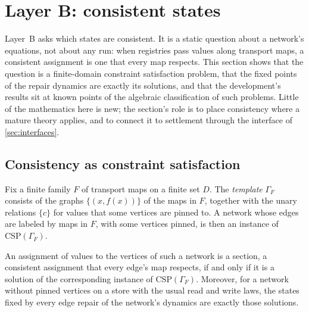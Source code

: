 
\section{Layer B: consistent states}\label{sec:layer-b}

Layer~B asks which states are consistent. It is a static question about a network's equations, not
about any run: when registries pass values along transport maps, a consistent assignment is one that
every map respects. This section shows that the question is a finite-domain constraint satisfaction
problem, that the fixed points of the repair dynamics are exactly its solutions, and that the
development's results sit at known points of the algebraic classification of such problems. Little of
the mathematics here is new; the section's role is to place consistency where a mature theory applies,
and to connect it to settlement through the interface of \cref{sec:interfaces}.

\subsection{Consistency as constraint satisfaction}

Fix a finite family $F$ of transport maps on a finite set $D$. The \emph{template} $\Gamma_F$ consists
of the graphs $\{(x, f(x))\}$ of the maps in $F$, together with the unary relations $\{c\}$ for values
that some vertices are pinned to. A network whose edges are labeled by maps in $F$, with some vertices
pinned, is then an instance of $\mathrm{CSP}(\Gamma_F)$.

\begin{theorem}\label{thm:csp}
An assignment of values to the vertices of such a network is a section, a consistent assignment that
every edge's map respects, if and only if it is a solution of the corresponding instance of
$\mathrm{CSP}(\Gamma_F)$. Moreover, for a network without pinned vertices on a store with the usual
read and write laws, the states fixed by every edge repair of the network's dynamics are exactly those
solutions.
\end{theorem}

